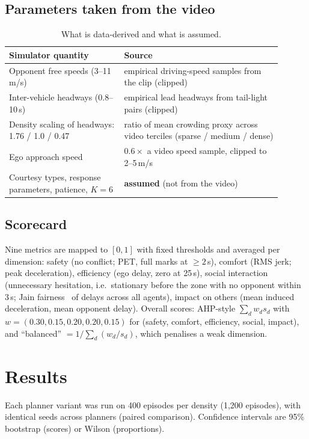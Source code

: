 \documentclass[11pt,a4paper]{article}
\begin{document}
\subsection{Parameters taken from the video}
\begin{table}[H]\centering\small
\begin{tabular}{p{0.38\linewidth}p{0.52\linewidth}}\toprule
Simulator quantity & Source\\\midrule
Opponent free speeds (3--11\,m/s) & empirical driving-speed samples from the clip (clipped)\\
Inter-vehicle headways (0.8--10\,s) & empirical lead headways from tail-light pairs (clipped)\\
Density scaling of headways: 1.76 / 1.0 / 0.47 & ratio of mean crowding proxy across video terciles (sparse / medium / dense)\\
Ego approach speed & $0.6\times$ a video speed sample, clipped to 2--5\,m/s\\\midrule
Courtesy types, response parameters, patience, $K=6$ & \textbf{assumed} (not from the video)\\\bottomrule
\end{tabular}\caption{What is data-derived and what is assumed.}\end{table}

\subsection{Scorecard}
Nine metrics are mapped to $[0,1]$ with fixed thresholds and averaged per dimension: safety (no conflict; PET, full marks at $\ge2$\,s), comfort (RMS jerk; peak deceleration), efficiency (ego delay, zero at 25\,s), social interaction (unnecessary hesitation, i.e.\ stationary before the zone with no opponent within 3\,s; Jain fairness~\cite{jain} of delays across all agents), impact on others (mean induced deceleration, mean opponent delay). Overall scores: AHP-style $\sum_d w_d s_d$ with $w=(0.30,0.15,0.20,0.20,0.15)$ for (safety, comfort, efficiency, social, impact), and ``balanced'' $=1/\sum_d (w_d/s_d)$, which penalises a weak dimension.

\section{Results}
Each planner variant was run on 400 episodes per density (1{,}200 episodes), with identical seeds across planners (paired comparison). Confidence intervals are 95\% bootstrap (scores) or Wilson (proportions).
\end{document}
